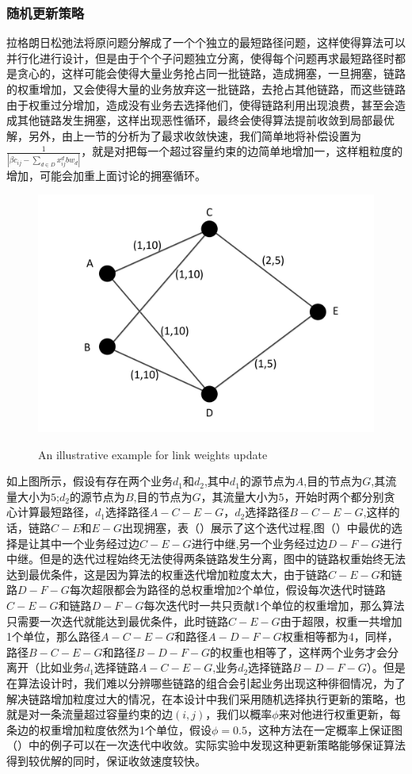 \subsubsection{随机更新策略}
  拉格朗日松弛法将原问题分解成了一个个独立的最短路径问题，这样使得算法可以并行化进行设计，但是由于个个子问题独立分离，使得每个问题再求最短路径时都是贪心的，这样可能会使得大量业务抢占同一批链路，造成拥塞，一旦拥塞，链路的权重增加，又会使得大量的业务放弃这一批链路，去抢占其他链路，而这些链路由于权重过分增加，造成没有业务去选择他们，使得链路利用出现浪费，甚至会造成其他链路发生拥塞，这样出现恶性循环，最终会使得算法提前收敛到局部最优解，另外，由上一节的分析为了最求收敛快速，我们简单地将补偿设置为$\frac{1}{|\beta c_{ij}-\sum\limits_{d \in D} x_{ij}^d bw_d|}$，就是对把每一个超过容量约束的边简单地增加一，这样粗粒度的增加，可能会加重上面讨论的拥塞循环。
\begin{figure}
\setlength{\belowcaptionskip}{-0.1cm}
  \begin{center}
    {\includegraphics[width=0.4 \textwidth]{figures/random.pdf}}
    \end{center}
  \caption{{\footnotesize{An illustrative example for link weights update}}}
  \label{IterNum}
\end{figure}
  如上图所示，假设有存在两个业务$d_1$和$d_2$,其中$d_1$的源节点为$A$,目的节点为$G$,其流量大小为$5$;$d_2$的源节点为$B$,目的节点为$G$，其流量大小为$5$，开始时两个都分别贪心计算最短路径，$d_1$选择路径$A-C-E-G$，$d_2$选择路径$B-C-E-G$,这样的话，链路$C-E$和$E-G$出现拥塞，表（）展示了这个迭代过程,图（）中最优的选择是让其中一个业务经过边$C-E-G$进行中继,另一个业务经过边$D-F-G$进行中继。但是的迭代过程始终无法使得两条链路发生分离，图中的链路权重始终无法达到最优条件，这是因为算法的权重迭代增加粒度太大，由于链路$C-E-G$和链路$D-F-G$每次超限都会为路径的总权重增加2个单位，假设每次迭代时链路$C-E-G$和链路$D-F-G$每次迭代时一共只贡献1个单位的权重增加，那么算法只需要一次迭代就能达到最优条件，此时链路$C-E-G$由于超限，权重一共增加1个单位，那么路径$A-C-E-G$和路径$A-D-F-G$权重相等都为4，同样，路径$B-C-E-G$和路径$B-D-F-G$的权重也相等了，这样两个业务才会分离开（比如业务$d_1$选择链路$A-C-E-G$,业务$d_2$选择链路$B-D-F-G$）。但是在算法设计时，我们难以分辨哪些链路的组合会引起业务出现这种徘徊情况，为了解决链路增加粒度过大的情况，在本设计中我们采用随机选择执行更新的策略，也就是对一条流量超过容量约束的边$(i,j)$，我们以概率$\phi$来对他进行权重更新，每条边的权重增加粒度依然为1个单位，假设$\phi=0.5$，这种方法在一定概率上保证图（）中的例子可以在一次迭代中收敛。实际实验中发现这种更新策略能够保证算法得到较优解的同时，保证收敛速度较快。
